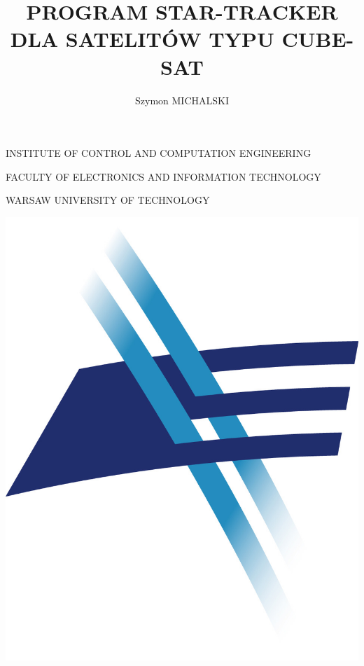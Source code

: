 \documentclass[12pt,a4paper,oneside]{article}
\author{Szymon MICHALSKI}
\title{PROGRAM STAR-TRACKER DLA SATELITÓW TYPU CUBE-SAT}
\begin{document}
\begin{titlepage}
	\centering

	INSTITUTE OF CONTROL AND COMPUTATION ENGINEERING\par
	FACULTY OF ELECTRONICS AND INFORMATION TECHNOLOGY\par
	WARSAW UNIVERSITY OF TECHNOLOGY\par
	\vspace{0.5cm}
	\includegraphics[scale=0.3]{logo_WEiTI.jpg}
	\hspace{1cm}

\end{titlepage}
\end{document}
